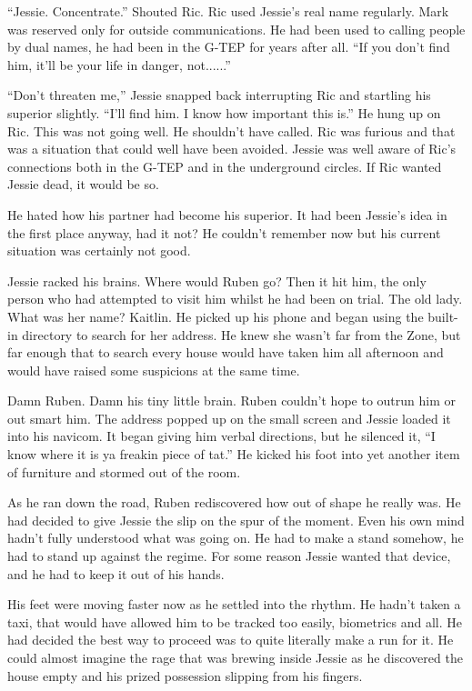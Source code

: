 ``Jessie.  Concentrate.''  Shouted Ric.  Ric used Jessie's real name regularly.  Mark was reserved only for outside communications.  He had been used to calling people by dual names, he had been in the G-TEP for years after all.  ``If you don't find him, it'll be your life in danger, not......''

``Don't threaten me,'' Jessie snapped back interrupting Ric and startling his superior slightly.  ``I'll find him.  I know how important this is.''  He hung up on Ric.  This was not going well.  He shouldn't have called.  Ric was furious and that was a situation that could well have been avoided.  Jessie was well aware of Ric's connections both in the G-TEP and in the underground circles.  If Ric wanted Jessie dead, it would be so.

He hated how his partner had become his superior.  It had been Jessie's idea in the first place anyway, had it not?  He couldn't remember now but his current situation was certainly not good.

Jessie racked his brains.  Where would Ruben go?  Then it hit him, the only person who had attempted to visit him whilst he had been on trial.  The old lady.  What was her name?  Kaitlin.  He picked up his phone and began using the built-in directory to search for her address.  He knew she wasn't far from the Zone, but far enough that to search every house would have taken him all afternoon and would have raised some suspicions at the same time.

Damn Ruben.  Damn his tiny little brain.  Ruben couldn't hope to outrun him or out smart him.  The address popped up on the small screen and Jessie loaded it into his navicom.  It began giving him verbal directions, but he silenced it, ``I know where it is ya freakin piece of tat.''  He kicked his foot into yet another item of furniture and stormed out of the room.  



\thoughtbreak



As he ran down the road, Ruben rediscovered how out of shape he really was.  He had decided to give Jessie the slip on the spur of the moment.  Even his own mind hadn't fully understood what was going on.  He had to make a stand somehow, he had to stand up against the regime.  For some reason Jessie wanted that device, and he had to keep it out of his hands.  

His feet were moving faster now as he settled into the rhythm.  He hadn't taken a taxi, that would have allowed him to be tracked too easily, biometrics and all.  He had decided the best way to proceed was to quite literally make a run for it.  He could almost imagine the rage that was brewing inside Jessie as he discovered the house empty and his prized possession slipping from his fingers.

